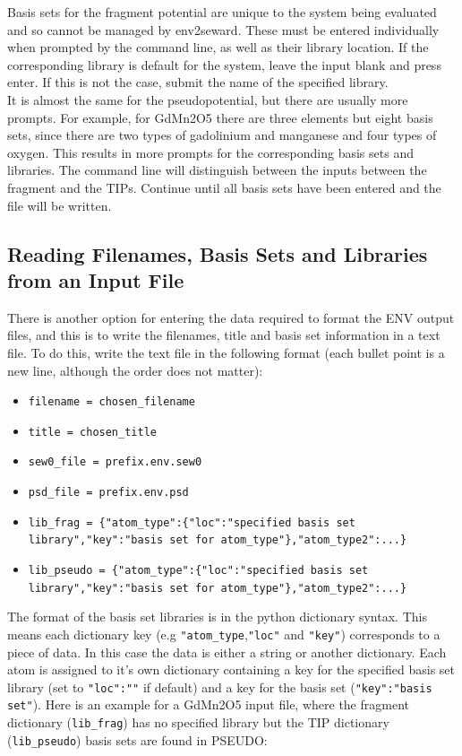 Basis sets for the fragment potential are unique to the system being evaluated and so cannot be managed by env2seward. These must be entered individually when prompted by the command line, as well as their library location. If the corresponding library is default for the system, leave the input blank and press enter. If this is not the case, submit the name of the specified library.
\\
It is almost the same for the pseudopotential, but there are usually more prompts. For example, for GdMn2O5 there are three elements but eight basis sets, since there are two types of gadolinium and manganese and four types of oxygen. This results in more prompts for the corresponding basis sets and libraries. The command line will distinguish between the inputs between the fragment and the TIPs. Continue until all basis sets have been entered and the file will be written.

\subsection{Reading Filenames, Basis Sets and Libraries from an Input File}

There is another option for entering the data required to format the ENV output files, and this is to write the filenames, title and basis set information in a text file. To do this, write the text file in the following format (each bullet point is a new line, although the order does not matter):

\begin{itemize}
	\item \texttt{filename = chosen\_filename}
	\item \texttt{title = chosen\_title}
	\item \texttt{sew0\_file = prefix.env.sew0}
	\item \texttt{psd\_file = prefix.env.psd}
	\item \texttt{lib\_frag = \{"atom\_type":\{"loc":"specified basis set library","key":"basis set for atom\_type"\},"atom\_type2":...\}}
	\item \texttt{lib\_pseudo = \{"atom\_type":\{"loc":"specified basis set library","key":"basis set for atom\_type"\},"atom\_type2":...\}}
\end{itemize}

The format of the basis set libraries is in the python dictionary syntax. This means each dictionary key (e.g \texttt{"atom\_type},\texttt{"loc"} and \texttt{"key"}) corresponds to a piece of data. In this case the data is either a string or another dictionary. Each atom is assigned to it's own dictionary containing a key for the specified basis set library (set to \texttt{"loc":""} if default) and a key for the basis set (\texttt{"key":"basis set"}).
Here is an example for a GdMn2O5 input file, where the fragment dictionary (\texttt{lib\_frag}) has no specified library but the TIP dictionary (\texttt{lib\_pseudo}) basis sets are found in PSEUDO:

